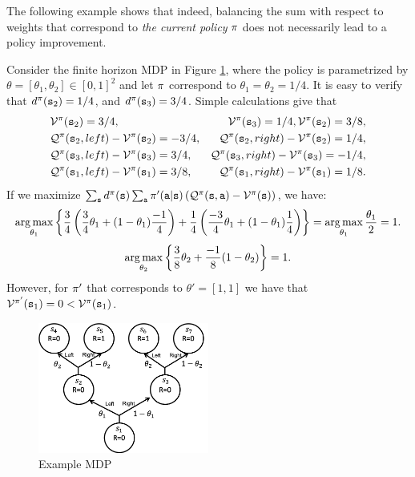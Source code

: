 The following example shows that indeed, balancing the sum with respect to weights that correspond to \textit{the current policy} $\pi$ does not necessarily lead to a policy improvement. 
\begin{example}\label{example:policy_diff}
    Consider the finite horizon MDP in Figure \ref{fig:policy-diff-example}, where the policy is parametrized by $\theta = [\theta_1,\theta_2]\in [0,1]^2$ and let ${\pi}$ correspond to $\theta_1=\theta_2=1/4$. It is easy to verify that $d^{\pi}({\tt s}_2) = 1/4$, and $d^{\pi}({\tt s}_3) = 3/4$. Simple calculations give that
    \begin{align*}
            &\mathcal{V}^{\pi}({\tt s}_2)=3/4, &\mathcal{V}^{\pi}({\tt s}_3)=1/4, 
            \mathcal{V}^{\pi}({\tt s}_2)=3/8,\\
            &\mathcal{Q}^{\pi}({\tt s}_2, left) - \mathcal{V}^{\pi}({\tt s}_2) = -3/4, 
            &\mathcal{Q}^{\pi}({\tt s}_2, right) - \mathcal{V}^{\pi}({\tt s}_2) = 1/4, \\
            &\mathcal{Q}^{\pi}({\tt s}_3, left) - \mathcal{V}^{\pi}({\tt s}_3) = 3/4, 
            &\mathcal{Q}^{\pi}({\tt s}_3, right) - \mathcal{V}^{\pi}({\tt s}_3) = -1/4, \\
            &\mathcal{Q}^{\pi}({\tt s}_1, left) - \mathcal{V}^{\pi}({\tt s}_1) = 3/8, 
            &\mathcal{Q}^{\pi}({\tt s}_1, right) - \mathcal{V}^{\pi}({\tt s}_1) = 1/8. 
    \end{align*}
    If we maximize $\sum_{{\tt s}} d^{\pi}({\tt s}) \sum_{\tt a} \pi'({\tt a}|{\tt s})\left( \mathcal{Q}^{\pi}({\tt s},{\tt a}) - \mathcal{V}^{\pi}({\tt s})\right)$, we have:
    \begin{equation*}
        \argmax_{\theta_1} \left\{ \frac{3}{4}\left(\frac{3}{4}\theta_1+(1-\theta_1)\frac{-1}{4}\right)+\frac{1}{4}\left(\frac{-3}{4}\theta_1+(1-\theta_1)\frac{1}{4}\right)\right\} = \argmax_{\theta_1} \frac{\theta_1}{2} = 1.
    \end{equation*}
    \begin{equation*}
        \argmax_{\theta_2} \left\{ \frac{3}{8}\theta_2+\frac{-1}{8}(1-\theta_2)\right\} = 1.
    \end{equation*}
    However, for $\pi'$ that corresponds to $\theta' = [1, 1]$ we have that $\mathcal{V}^{\pi'}({\tt s}_1) = 0 < \mathcal{V}^{\pi}({\tt s}_1)$.
\end{example}
\begin{figure}
    \centering
    \includegraphics[width=0.5\textwidth]{figures/policy_diff.png}
    \caption{Example MDP}
    \label{fig:policy-diff-example}
\end{figure}

